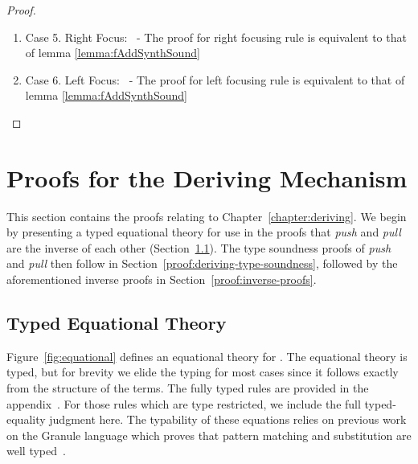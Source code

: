 \begin{proof}
\begin{enumerate}
\begin{enumerate}
\[          \]
          from case 4 of the lemma. By induction on the second premise, we have that:
          \[
            [[G |- A =>+ t2 ; D2 ]] \tag{ih2}
          \]
          from case 3 of the lemma. From which, we can construct the following instantiation of the \addPruningAppName\ synthesis rule in the non-focusing calculus:
          \[
\inferrule*[right=L$^{\prime}\multimap^{+}$]
    {[[G, x2 : B |- C =>+ t1 ; D1, x2 : B]] \\ [[G - D1 |- A =>+ t2 ; D2 ]]}{[[G, x1 : A -o B |- C =>+
    [(x1 t2) / x2] t1 ; (D1 + D2), x1 : A -o B]] }
          \]
      \end{enumerate}
    \item Case 5. Right Focus: \fAddFocusRName\ - The proof for right focusing rule is equivalent to that of lemma \eqref{lemma:fAddSynthSound}\\
    \item Case 6. Left Focus: \fAddFocusLName\ - The proof for left focusing rule is equivalent to that of lemma \eqref{lemma:fAddSynthSound}\\
  \end{enumerate}
\end{proof}

\section{Proofs for the Deriving Mechanism}
This section contains the proofs relating to Chapter~\ref{chapter:deriving}. We begin 
by presenting a typed equational theory for use in the proofs that \emph{push} and 
\emph{pull} are the inverse of each other (Section~\ref{sec:typed-eq}). The type soundness proofs 
of \emph{push} and \emph{pull} then follow in Section~\ref{proof:deriving-type-soundness}, followed by the aforementioned 
inverse proofs in Section~\ref{proof:inverse-proofs}.

\subsection{Typed Equational Theory}
\label{sec:typed-eq}

Figure~\ref{fig:equational} defines an equational theory for
\grminip{}. The equational theory is typed, but for brevity we elide
the typing for most cases since it follows
exactly from the structure of the terms. The fully typed
 rules are provided in the appendix~\cite{appendix}. For
those rules which are type restricted, we include the full
typed-equality judgment here. The typability of these equations relies on previous work on the Granule language which proves that pattern matching and substitution are well typed~\cite{DBLP:journals/pacmpl/OrchardLE19}.

